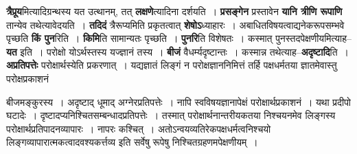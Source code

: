 \documentclass[article,12pt,a4paper]{memoir}
\begin{document}
	  \pstart \textbf{त्रैप्रूय}मित्यादिग्रन्थस्य यत उत्थानम्, तत् \textbf{लक्षणे}त्यादिना दर्शयति । \textbf{प्रसङ्गेन} प्रस्तावेन \textbf{यानि त्रीणि रूपाणि} तान्येव तथेत्यावेदयति । \textbf{तदिदं} त्रैरूप्यमिति प्रकृतत्वात् \textbf{शेषोऽ}ध्याहारः । अबाधितविषयत्वाद्यनेकरूपसम्भवे पृच्छति \textbf{किं पुन}रिति । \textbf{किमि}ति सामान्यतः पृच्छति । \textbf{पुनरि}ति विशेषतः । कस्मात् पुनस्तदपेक्षणीयमित्याह--\textbf{यत} इति । परोक्षो योऽर्थस्तस्य यज्ज्ञानं तस्य । \textbf{बीजं} वैधर्म्यदृष्टान्तः । कस्मान्न तथेत्याह--\textbf{अदृष्टादि}ति । \textbf{अप्रतिपत्तेः} परोक्षार्थस्येति प्रकरणात् । यद्यज्ञातं लिङ्गं न परोक्षज्ञाननिमित्तं तर्हि पक्षधर्मतया ज्ञातमेवास्तु परोक्षप्रकाशनं  \leavevmode{} 
	  
	बीजमङ्कुरस्य । अदृष्टाद् धूमाद् अग्नेरप्रतिपत्तेः । नापि स्वविषयज्ञानापेक्षं परोक्षार्थप्रकाशनं । यथा प्रदीपो घटादेः । दृष्टादप्यनिश्चितसम्बन्धादप्रतिपत्तेः । तस्मात् परोक्षार्थनान्तरीयकतया निश्चयनमेव लिङ्गस्य परोक्षार्थप्रतिपादनव्यापारः । नापरः कश्चित् । अतोऽन्वयव्यतिरेकपक्षधर्मत्वनिश्चयो लिङ्गव्यापारात्मकत्वादवश्यकर्त्तव्य इति सर्वेषु रूपेषु निश्चितग्रहणमपेक्षणीयम् ।  
	  
\end{document}
